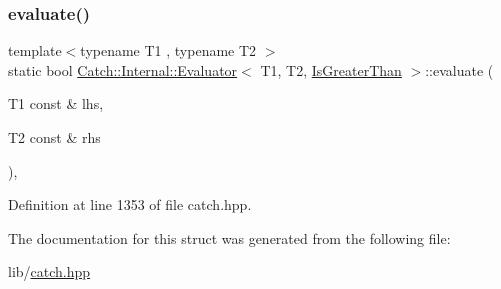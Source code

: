 \subsubsection{\texorpdfstring{evaluate()}{evaluate()}}
{\footnotesize\ttfamily template$<$typename T1 , typename T2 $>$ \\
static bool \hyperlink{class_catch_1_1_internal_1_1_evaluator}{Catch\+::\+Internal\+::\+Evaluator}$<$ T1, T2, \hyperlink{namespace_catch_1_1_internal_ae3f96598a7858155750bf38e7295d83eac0e8866139e99803d169595af70f6c22}{Is\+Greater\+Than} $>$\+::evaluate (\begin{DoxyParamCaption}\item[{T1 const \&}]{lhs,  }\item[{T2 const \&}]{rhs }\end{DoxyParamCaption})\hspace{0.3cm}{\ttfamily [inline]}, {\ttfamily [static]}}



Definition at line 1353 of file catch.\+hpp.



The documentation for this struct was generated from the following file\+:\begin{DoxyCompactItemize}
\item 
lib/\hyperlink{catch_8hpp}{catch.\+hpp}\end{DoxyCompactItemize}

